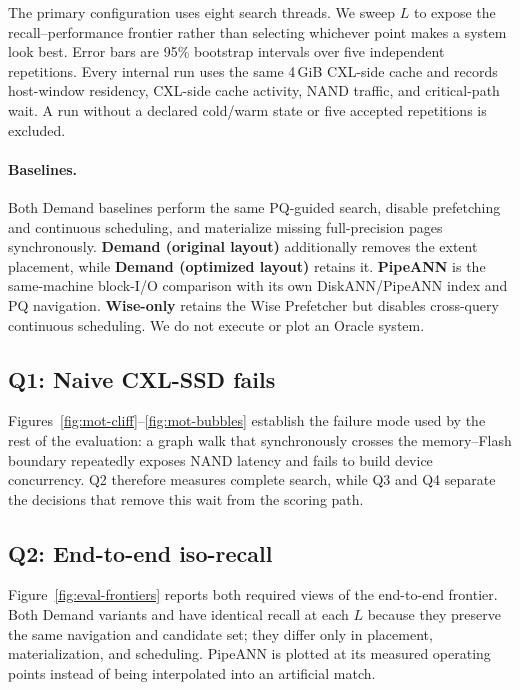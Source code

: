 The primary configuration uses eight search threads. We sweep $L$ to expose
the recall--performance frontier rather than selecting whichever point makes a
system look best. Error bars are 95\% bootstrap intervals over five independent
repetitions. Every internal run uses the same 4\,GiB CXL-side cache and records
host-window residency, CXL-side cache activity, NAND traffic, and critical-path
wait. A run without a declared cold/warm state or five accepted repetitions is
excluded.

\paragraph{Baselines.}
Both Demand baselines perform the same PQ-guided search, disable prefetching
and continuous scheduling, and materialize missing full-precision pages
synchronously. \textbf{Demand (original layout)} additionally removes the
extent placement, while \textbf{Demand (optimized layout)} retains it.
\textbf{PipeANN} is the same-machine block-I/O comparison with its own
DiskANN/PipeANN index and PQ navigation.
\textbf{Wise-only} retains the Wise Prefetcher but disables cross-query
continuous scheduling. We do not execute or plot an Oracle system.

\subsection{Q1: Naive CXL-SSD fails}
\label{sec:eval-mot}

Figures~\ref{fig:mot-cliff}--\ref{fig:mot-bubbles} establish the failure mode
used by the rest of the evaluation: a graph walk that synchronously crosses
the memory--Flash boundary repeatedly exposes NAND latency and fails to build
device concurrency. Q2 therefore measures complete search, while Q3 and Q4
separate the decisions that remove this wait from the scoring path.

\subsection{Q2: End-to-end iso-recall}
\label{sec:eval-main}

Figure~\ref{fig:eval-frontiers} reports both required
views of the end-to-end frontier. Both Demand variants and \sys{} have
identical recall at each $L$ because they preserve the same navigation and
candidate set; they differ only in placement, materialization, and scheduling.
PipeANN is plotted at its measured operating points instead of being
interpolated into an artificial match.

